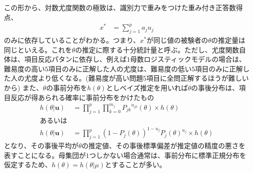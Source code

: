 \documentclass[12pt]{jarticle}
\begin{document}
この形から、対数尤度関数の極致は、識別力で重みをつけた重み付き正答数得点、
\begin{align}
  \label{06}
  \displaystyle x^{\ast} &= \sum_{j = 1}^{p} a_ju_j \tag{8}
\end{align}
のみに依存していることがわかる。つまり、$x^{\ast}$が同じ値の被験者の$\theta$の推定量は同じといえる。これを$\theta$の推定に際する十分統計量と呼ぶ。ただし、尤度関数自体は、項目反応パタンに依存し、例えば$1$母数ロジスティックモデルの場合は、難易度の高い$5$項目のみに正解した人の尤度は、難易度の低い$5$項目のみに正解した人の尤度より低くなる。(難易度が高い問題$5$項目に全問正解するほうが難しいから)
また、$\theta$の事前分布を$h(\theta)$としベイズ推定を用いれば$\theta$の事後分布は、項目反応が得あられる確率に事前分布をかけたもの
\begin{align*}
  \label{07}
  \displaystyle h(\theta|\boldsymbol{u})&=\prod_{j = 1}^{p} \prod_{k = 0}^{m_j} {P_{jk}}^{u_{jk}}(\theta)\times h(\theta)\\
  あるいは\\
  h(\theta|\boldsymbol{u}) &= \prod_{j = 1}^{p} (1 - P_j(\theta))^{1 - u_j}P_j(\theta)^{u_j} \times h(\theta) \tag{9}
\end{align*}
となり、その事後平均が$\theta$の推定値、その事後標準偏差が推定値の精度の悪さを表すことになる。母集団が$1$つしかない場合通常は、事前分布に標準正規分布を仮定するため、$h(\theta) = h(\theta|\mu)$とすることが多い。
\end{document}
